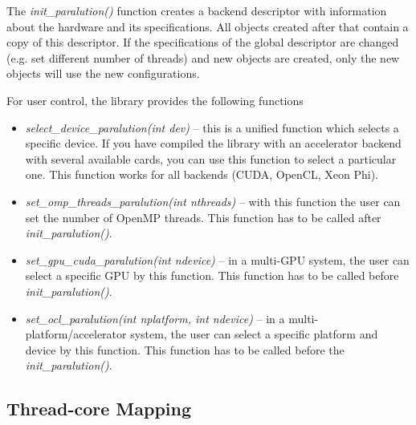 





The \emph{init\_paralution()} function creates a backend descriptor with information about the hardware and its specifications. All objects created after that contain a copy of this descriptor. If the specifications of the global descriptor are changed (e.g. set different number of threads) and new objects are created, only the new objects will use the new configurations.

\vspace{6mm}
For user control, the library provides the following functions
\begin{itemize}
\itemsep0em

\item \emph{select\_device\_paralution(int dev)} -- this is a unified function which selects a specific device. If you have compiled the library with an accelerator backend with several available cards, you can use this function to select a particular one. This function works for all backends (CUDA, OpenCL, Xeon Phi).

\item \emph{set\_omp\_threads\_paralution(int nthreads)} -- with this function the user can set the number of OpenMP 	threads. This function has to be called after \emph{init\_paralution()}. 

\item \emph{set\_gpu\_cuda\_paralution(int ndevice)} -- in a multi-GPU system, the user can select a specific GPU by this function. This function has to be called before \emph{init\_paralution()}. 

\item \emph{set\_ocl\_paralution(int nplatform, int ndevice)} -- in a multi-platform/accelerator system, the user can select a specific platform and device by this function. This function has to be called before the \emph{init\_paralution()}. 

\end{itemize}

\subsection{Thread-core Mapping}


